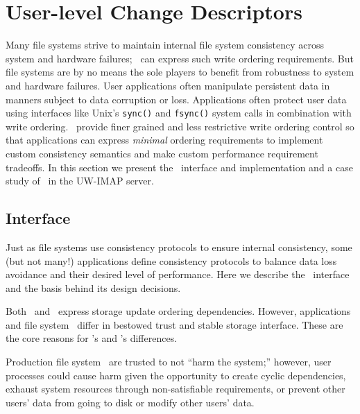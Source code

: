 \section{User-level Change Descriptors}
\label{sec:opgroup}

\newcommand{\opgroupCreate}{\texttt{opgroup\_create()}}
\newcommand{\opgroupSync}{\texttt{opgroup\_sync()}}
\newcommand{\opgroupAddDepend}{\texttt{opgroup\_add\_depend()}}
\newcommand{\opgroupEngage}{\texttt{opgroup\_engage()}}
\newcommand{\opgroupDisengage}{\texttt{opgroup\_disengage()}}
\newcommand{\opgroupRelease}{\texttt{opgroup\_release()}}
\newcommand{\opgroupAbandon}{\texttt{opgroup\_abandon()}}

Many file systems strive to maintain internal file system consistency
across system and hardware failures; \chdescs\ can express such write
ordering requirements. But file systems are by no means the sole
players to benefit from robustness to system and hardware failures.
User applications often manipulate persistent data in manners subject
to data corruption or loss. Applications often protect user data using
interfaces like Unix's \texttt{sync()} and \texttt{fsync()} system
calls in combination with write ordering. \Opgroups\ provide finer
grained and less restrictive write ordering control so that
applications can express \textit{minimal} ordering requirements to
implement custom consistency semantics and make custom performance
requirement tradeoffs. In this section we present the \opgroup\
interface and implementation and a case study of \opgroups\ in the
UW-IMAP server.

\subsection{Interface}
\label{sec:opgroup:interface}
Just as file systems use consistency protocols to ensure internal
consistency, some (but not many!) applications define consistency
protocols to balance data loss avoidance and their desired level of
performance. Here we describe the \opgroup\ interface and the basis
behind its design decisions.

Both \opgroups\ and \chdescs\ express storage update ordering
dependencies. However, applications and file system \modules\ differ
in bestowed trust and stable storage interface. These are the core
reasons for \opgroup{}'s and \chdesc{}'s differences.

Production file system \modules\ are trusted to not ``harm the
system;'' however, user processes could cause harm given the
opportunity to create cyclic dependencies, exhaust system resources
through non-satisfiable requirements, or prevent other users' data
from going to disk or modify other users' data.

